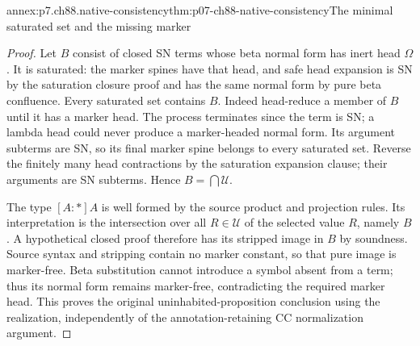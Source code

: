\begin{annexitem}{annex:p7.ch88.native-consistency}{thm:p07-ch88-native-consistency}{The minimal saturated set and the missing marker}
\begin{proof}
Let \(B\) consist of closed SN terms whose beta normal form has
inert head \(\Omega\). It is saturated: the marker spines have
that head, and safe head expansion is SN by the saturation closure
proof and has the same normal form by pure beta confluence. Every
saturated set contains \(B\). Indeed head-reduce a member of \(B\)
until it has a marker head. The process terminates since the term is
SN; a lambda head could never produce a marker-headed normal form.
Its argument subterms are SN, so its final marker spine belongs to
every saturated set. Reverse the finitely many head contractions by
the saturation expansion clause; their arguments are SN subterms.
Hence \(B=\bigcap\mathcal U\).

The type \([A:\ast]A\) is well formed by the source product and
projection rules. Its interpretation is the intersection over all
\(R\in\mathcal U\) of the selected value \(R\), namely \(B\).
A hypothetical closed proof therefore has its stripped image in \(B\)
by soundness. Source syntax and stripping contain no marker constant,
so that pure image is marker-free. Beta substitution cannot introduce
a symbol absent from a term; thus its normal form remains marker-free,
contradicting the required marker head. This proves the original
uninhabited-proposition conclusion using the realization, independently
of the annotation-retaining CC normalization argument.
\end{proof}
\end{annexitem}
